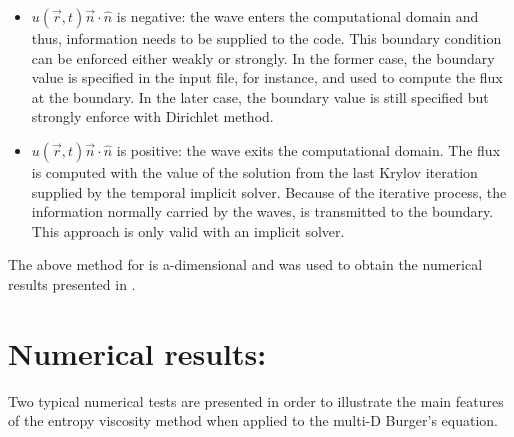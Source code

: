\begin{itemize}
\item $u(\vec{r},t) \vec{n} \cdot \hat{n} $ is negative: the wave enters the computational domain and thus, information needs to be supplied to the code. This boundary condition can be enforced either weakly or strongly. In the former case, the boundary value is specified in the input file, for instance, and used to compute the flux at the boundary. In the later case, the boundary value is still specified but strongly enforce with Dirichlet method.
\item $u(\vec{r},t) \vec{n} \cdot \hat{n} $ is positive: the wave exits the computational domain. The flux is computed with the value of the solution from the last Krylov iteration supplied by the temporal implicit solver. Because of the iterative process, the information normally carried by the waves, is transmitted to the boundary. This approach is only valid with an implicit solver.
\end{itemize}
The above method for is a-dimensional and was used to obtain the numerical results presented in .
\section{Numerical results:}\label{sec:num_sct2b}
Two typical numerical tests are presented in order to illustrate the main features of the entropy viscosity method when applied to the multi-D Burger's equation.
%
